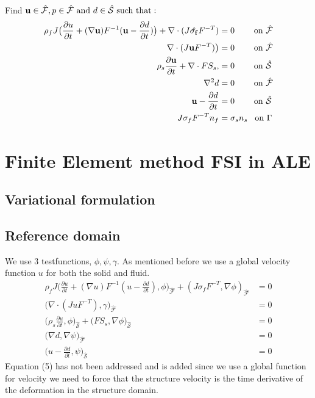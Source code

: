 Find $\bold{u} \in \hat{\mathcal{F}} , p \in \hat{\mathcal{F}} \text{  and  } d \in \hat{\mathcal{S}} \text{  such that}:$ 
\begin{align}
\rho_f J \big( \frac{\partial u}{\partial t} + (\nabla \bold{u} )F^{-1}(\bold{u} -\frac{\partial d}{\partial t})\big)  + \nabla \cdot( J \hat{\sigma_f} F^{-T})  &= 0 \hspace{8mm}\text{on  } \hat{\mathcal{F}} \\
\nabla \cdot (J \bold{u}  F^{-T})\big) &= 0 \hspace{8mm} \text{on  } \hat{\mathcal{F}}   \\
\rho_s \frac{\partial \bold{u} }{\partial t} + \nabla \cdot F S_s,&=0 \hspace{8mm} \text{on  } \hat{\mathcal{S}}\\
\nabla^2 d &= 0 \hspace{8mm} \text{on  } \hat{\mathcal{F}}\\
\bold{u} - \frac{\partial d}{\partial t}  &= 0 \hspace{8mm} \text{on  } \hat{\mathcal{S}}\\
J\sigma_f F^{-T} n_f &= \sigma_s  n_s \hspace{3mm} \text{on  } \Gamma
\end{align}



\section*{Finite Element method FSI in ALE}
\subsection*{Variational formulation}
\subsection*{Reference domain}
We use 3 testfunctions, $\phi, \psi, \gamma$. As mentioned before we use a global velocity function $u$ for both the solid and fluid.
\begin{align}
\rho_f J \big( \frac{\partial u}{\partial t} + (\nabla u)F^{-1}(u-\frac{\partial d}{\partial t}) , \phi\big)_{\mathcal{\hat{F}}} + (J\sigma_f F^{-T},\nabla \phi )_{\mathcal{\hat{F}}} &= 0  \\
 \big( \nabla \cdot (J u F^{-T}),\gamma \big)_{\mathcal{\hat{F}}} &= 0 \\
\big(\rho_s \frac{\partial u}{\partial t},\phi \big)_{\mathcal{\hat{S}}} + \big(F S_s, \nabla \phi \big)_{\mathcal{\hat{S}}} &=0 \\
 \big( \nabla d , \nabla \psi \big)_{\mathcal{\hat{F}}} &= 0 \\
 \big( u- \frac{\partial d}{\partial t} ,\psi \big)_{\mathcal{\hat{S}}} &= 0 
\end{align}
Equation (5) has not been addressed and is added since we use a global function for velocity we need to force that the structure velocity is the time derivative of the deformation in the structure domain. 


